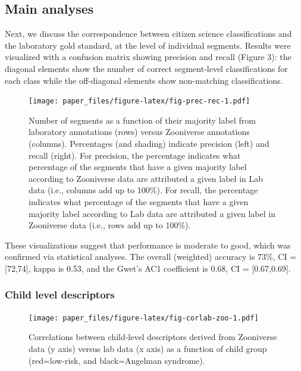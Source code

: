 \documentclass[english,,man]{apa6}
\begin{document}
\hypertarget{main-analyses}{%
\subsection{Main analyses}\label{main-analyses}}

Next, we discuss the correspondence between citizen science classifications and the laboratory gold standard, at the level of individual segments. Results were visualized with a confusion matrix showing precision and recall (Figure 3): the diagonal elements show the number of correct segment-level classifications for each class while the off-diagonal elements show non-matching classifications.

\begin{figure}
\centering
\texttt{[image: paper\_files/figure-latex/fig-prec-rec-1.pdf]}
\caption{\label{fig:fig-prec-rec}Number of segments as a function of their majority label from laboratory annotations (rows) versus Zooniverse annotations (columns). Percentages (and shading) indicate precision (left) and recall (right). For precision, the percentage indicates what percentage of the segments that have a given majority label according to Zooniverse data are attributed a given label in Lab data (i.e., columns add up to 100\%). For recall, the percentage indicates what percentage of the segments that have a given majority label according to Lab data are attributed a given label in Zooniverse data (i.e., rows add up to 100\%).}
\end{figure}

These visualizations suggest that performance is moderate to good, which was confirmed via statistical analyses. The overall (weighted) accuracy is 73\%, CI = {[}72,74{]}, kappa is 0.53, and the Gwet's AC1 coefficient is 0.68, CI = {[}0.67,0.69{]}.

\hypertarget{child-level-descriptors}{%
\subsubsection{Child level descriptors}\label{child-level-descriptors}}

\begin{figure}
\centering
\texttt{[image: paper\_files/figure-latex/fig-corlab-zoo-1.pdf]}
\caption{\label{fig:fig-corlab-zoo}Correlations between child-level descriptors derived from Zooniverse data (y axis) versus lab data (x axis) as a function of child group (red=low-risk, and black=Angelman syndrome).}
\end{figure}
\end{document}
